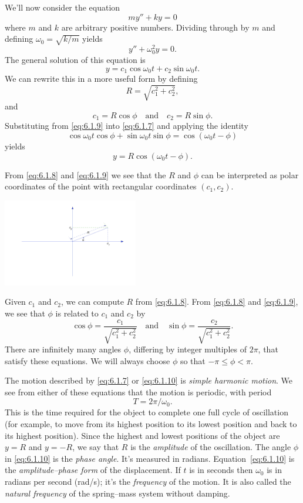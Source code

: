 \documentclass{ximera}
\begin{document}
We'll now consider the equation
$$
my''+ky=0
$$
where $m$ and $k$ are arbitrary positive numbers. Dividing through by
$m$ and defining $\omega_0=\sqrt{k/m}$ yields
$$
y''+\omega_0^2y=0.
$$
The general solution of this equation is
\begin{equation}\label{eq:6.1.7}
y=c_1\cos\omega_0t+c_2\sin\omega_0t.
\end{equation}
We can rewrite this in a more useful form by defining
\begin{equation}\label{eq:6.1.8}
R=\sqrt{c_1^2+c_2^2},
\end{equation}
and
\begin{equation}\label{eq:6.1.9}
c_1=R\cos\phi\quad\mbox{and}\quad c_2=R\sin\phi.
\end{equation}
Substituting from \eqref{eq:6.1.9} into \eqref{eq:6.1.7} and applying the
identity
$$
\cos\omega_0t\cos\phi+\sin\omega_0t\sin\phi=\cos(\omega_0t-\phi)
$$
yields
\begin{equation}\label{eq:6.1.10}
y=R\cos(\omega_0t-\phi).
\end{equation}

From \eqref{eq:6.1.8} and \eqref{eq:6.1.9} we see that the $R$ and $\phi$
can be interpreted as polar coordinates of the point with rectangular
coordinates $(c_1,c_2)$. 

\begin{image}
  \includegraphics[height=1.5in]{fig060105.jpg} 
\end{image}

Given $c_1$ and
$c_2$, we can compute $R$ from \eqref{eq:6.1.8}. From \eqref{eq:6.1.8} and
\eqref{eq:6.1.9}, we see that $\phi$ is related to $c_1$ and $c_2$ by
$$
\cos\phi=\frac{c_1}{\sqrt{c_1^2+c_2^2}}\quad\mbox{and}\quad\sin\phi=
\frac{c_2}{\sqrt{c_1^2+c_2^2}}.
$$
There are infinitely many angles $\phi$, differing
 by integer multiples of $2\pi$, that satisfy these equations. We
will always choose $\phi$ so that $-\pi\leq\phi<\pi$.


The motion described by \eqref{eq:6.1.7} or \eqref{eq:6.1.10}
is  \textit{simple harmonic motion}. We see from either of these
equations that the motion is periodic, with period
$$
T=2\pi/\omega_0.
$$
This is the time required for the object to complete one full cycle of
oscillation (for example, to move from its highest position to its
lowest position and back to its highest position). Since the highest
and lowest positions of the object are $y=R$ and $y=-R$, we say that
$R$ is the \textit{amplitude} of the oscillation. The angle $\phi$ in
\eqref{eq:6.1.10} is the \textit{phase angle}. It's measured
in
radians. Equation~\eqref{eq:6.1.10} is the \textit{amplitude--phase
form} of the displacement. If $t$ is in seconds then $\omega_0$ is
in radians per second (rad/s);   it's  the \textit{frequency} of
the motion. It is also called the \textit{natural frequency} of
the spring--mass system without damping.
\end{document}
